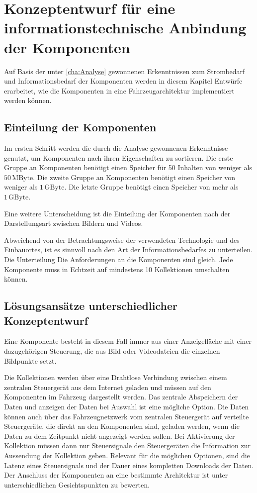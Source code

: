 \chapter{Konzeptentwurf für eine informationstechnische Anbindung der Komponenten} \label{cha:Konzeptentwurf}
Auf Basis der unter \ref{cha:Analyse} gewonnenen Erkenntnissen zum Strombedarf und Informationsbedarf der Komponenten werden in diesem Kapitel Entwürfe erarbeitet, wie die Komponenten in eine Fahrzeugarchitektur implementiert werden können.
\section{Einteilung der Komponenten}
Im ersten Schritt werden die durch die Analyse gewonnenen Erkenntnisse genutzt, um Komponenten nach ihren Eigenschaften zu sortieren.
Die erste Gruppe an Komponenten benötigt einen Speicher für 50 Inhalten von weniger als $ 50\,\mathrm{MByte} $.
Die zweite Gruppe an Komponenten benötigt einen Speicher von weniger als $ 1\,\mathrm{GByte} $.
Die letzte Gruppe benötigt einen Speicher von mehr als $ 1\,\mathrm{GByte} $.

Eine weitere Unterscheidung ist die Einteilung der Komponenten nach der Darstellungsart zwischen Bildern und Videos.


Abweichend von der Betrachtungsweise der verwendeten Technologie und des Einbauortes, ist es sinnvoll nach den Art der Informationsbedarfes zu unterteilen. Die Unterteilung 
Die Anforderungen an die Komponenten sind gleich. Jede Komponente muss in Echtzeit auf mindestens 10 Kollektionen umschalten können.
\section{Lösungsansätze unterschiedlicher Konzeptentwurf}
Eine Komponente besteht in diesem Fall immer aus einer Anzeigefläche mit einer dazugehörigen Steuerung, die aus Bild oder Videodateien die einzelnen Bildpunkte setzt.

Die Kollektionen werden über eine Drahtlose Verbindung zwischen einem zentralen Steuergerät aus dem Internet geladen und müssen auf den Komponenten im Fahrzeug dargestellt werden. 
Das zentrale Abspeichern der Daten und anzeigen der Daten bei Auswahl ist eine mögliche Option.
Die Daten können auch über das Fahrzeugnetzwerk vom zentralen Steuergerät auf verteilte Steuergeräte, die direkt an den Komponenten sind, geladen werden, wenn die Daten zu dem Zeitpunkt nicht angezeigt werden sollen. Bei Aktivierung der Kollektion müssen dann nur Steuersignale den Steuergeräten die Information zur Aussendung der Kollektion geben.
Relevant für die möglichen Optionen, sind die Latenz eines Steuersignals und der Dauer eines kompletten Downloads der Daten.
Der Anschluss der Komponenten an eine bestimmte Architektur ist unter unterschiedlichen Gesichtspunkten zu bewerten.


